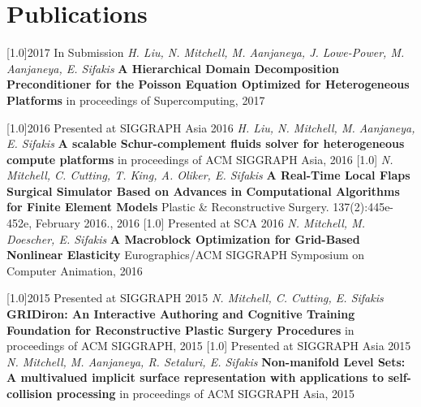 \documentclass{cv-style}     %
\begin{document}
\section{Publications}
  \vspace{-0.2cm}
\begin{entrylist}
\entry
{\scalebox{.8}[1.0]{2017}}
{}
{In Submission}
{\textit{H. Liu, N. Mitchell, M. Aanjaneya, J. Lowe-Power, M. Aanjaneya, E. Sifakis} \textbf{A Hierarchical Domain Decomposition Preconditioner for the Poisson Equation Optimized for Heterogeneous Platforms}  in proceedings of
Supercomputing, 2017}
\end{entrylist}
\begin{entrylist}
\entry
{\scalebox{.8}[1.0]{2016}}
{}
{Presented at SIGGRAPH Asia 2016}
{\textit{H. Liu, N. Mitchell, M. Aanjaneya, E. Sifakis} \textbf{A
scalable Schur-complement fluids solver for
heterogeneous compute platforms}  in proceedings of
ACM SIGGRAPH Asia, 2016}
\entry
{\scalebox{.8}[1.0]{}}
{}
{}
{\textit{N. Mitchell, C. Cutting, T. King, A. Oliker,
E. Sifakis}  \textbf{A Real-Time Local Flaps Surgical
Simulator Based on Advances in Computational
Algorithms for Finite Element Models}  Plastic \&
Reconstructive Surgery. 137(2):445e-452e, February
2016., 2016}
\entry
{\scalebox{.8}[1.0]{}}
{}
{Presented at SCA 2016}
{\textit{N. Mitchell, M. Doescher, E. Sifakis}  \textbf{A Macroblock
Optimization for Grid-Based Nonlinear Elasticity}
Eurographics/ACM SIGGRAPH Symposium on Computer
Animation, 2016}
\end{entrylist}
\begin{entrylist}
\entry
{\scalebox{.8}[1.0]{2015}}
{}
{Presented at SIGGRAPH 2015}
{\textit{N. Mitchell, C. Cutting, E. Sifakis}  \textbf{GRIDiron: An
Interactive Authoring and Cognitive Training
Foundation for Reconstructive Plastic Surgery
Procedures}  in proceedings of ACM SIGGRAPH, 2015}
\entry
{\scalebox{.8}[1.0]{}}
{}
{Presented at SIGGRAPH Asia 2015}
{\textit{N. Mitchell, M. Aanjaneya, R. Setaluri, E. Sifakis}
\textbf{Non-manifold Level Sets: A multivalued implicit
surface representation with applications to
self-collision processing}  in proceedings of ACM
SIGGRAPH Asia, 2015}
\end{entrylist}
\end{document}
